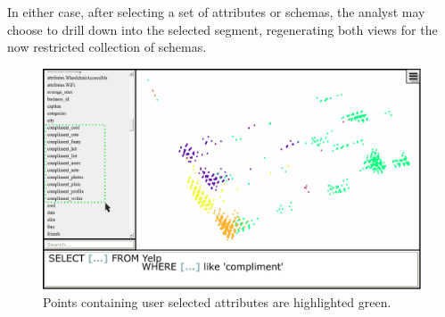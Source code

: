 In either case, after selecting a set of attributes or schemas, the analyst may choose to drill down into the selected segment, regenerating both views for the now restricted collection of schemas.





\begin{figure}
\includegraphics[width=1.0\linewidth]{SchemaSummarization/img/YelpUIH.pdf}
\caption{Points containing user selected attributes are highlighted green.}
\label{fig:yelpH}
\end{figure}



